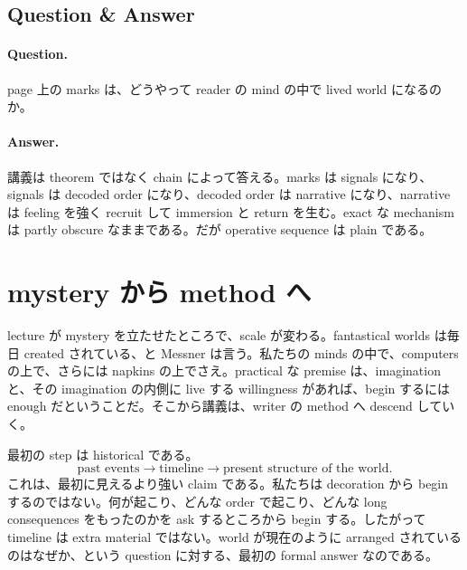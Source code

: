 \subsection{Question \& Answer}

\paragraph{Question.} page 上の marks は、どうやって reader の mind の中で lived world になるのか。

\paragraph{Answer.} 講義は theorem ではなく chain によって答える。marks は signals になり、signals は decoded order になり、decoded order は narrative になり、narrative は feeling を強く recruit して immersion と return を生む。exact な mechanism は partly obscure なままである。だが operative sequence は plain である。

\section{mystery から method へ}

lecture が mystery を立たせたところで、scale が変わる。fantastical worlds は毎日 created されている、と Messner は言う。私たちの minds の中で、computers の上で、さらには napkins の上でさえ。practical な premise は、imagination と、その imagination の内側に live する willingness があれば、begin するには enough だということだ。そこから講義は、writer の method へ descend していく。

最初の step は historical である。
\begin{equation}
\text{past events} \to \text{timeline} \to \text{present structure of the world}.
\end{equation}
これは、最初に見えるより強い claim である。私たちは decoration から begin するのではない。何が起こり、どんな order で起こり、どんな long consequences をもったのかを ask するところから begin する。したがって timeline は extra material ではない。world が現在のように arranged されているのはなぜか、という question に対する、最初の formal answer なのである。

